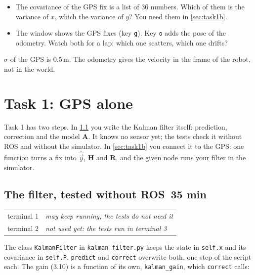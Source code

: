 \documentclass[11pt,a4paper,parskip=half]{scrartcl}
\makeatletter
\newcommand{\thema}[1]{\texttt{#1}}
\newcommand{\datei}[1]{\texttt{#1}}
\newcommand{\minutes}[1]{\texorpdfstring{\hfill{\normalsize\mdseries\color{ohmgrey}\faClock[regular]~#1 min}}{}}
\newcommand{\mat}[1]{\mathbf{#1}}
\newcommand{\solution}[1]{\ifdefined\withsolution\InputIfFileExists{solutions/#1}{}{}\fi}
\newcommand{\runningtext}[2]{\begin{tcolorbox}[base, colback=black!3, borderline west={2.5pt}{0pt}{ohmgrey},
        title={\faTerminal~Running}, coltitle=ohmgrey, colbacktitle=black!3, fonttitle=\small\bfseries,
        toptitle=2pt, bottomtitle=0pt, fontupper=\small]
  \begin{tabularx}{\linewidth}{@{}>{\color{ohmgrey}}l >{\raggedright\arraybackslash}X@{}}
    terminal 1 & #1 \\
    terminal 2 & #2
  \end{tabularx}
\end{tcolorbox}}
\newcommand{\notyet}[1]{\textcolor{ohmgrey}{\emph{#1}}}
\makeatother
\begin{document}
\begin{itemize}
  \item The covariance of the GPS fix is a list of 36 numbers. Which of them is the variance of \(x\), which
        the variance of \(y\)? You need them in \cref{sec:task1b}.
  \item The window shows the GPS fixes (key \thema{g}). Key \thema{o} adds the pose of the odometry. Watch
        both for a lap: which one scatters, which one drifts?
\end{itemize}

\begin{checkpoint}
\(\sigma\) of the GPS is 0.5\,m. The odometry gives the velocity in the frame of the robot, not in the world.
\end{checkpoint}
\solution{task0}

\newpage
\section{Task 1: GPS alone}
\label{sec:task1}
Task 1 has two steps. In \cref{sec:task1a} you write the Kalman filter itself: prediction, correction and the
model \(\mat A\). It knows no sensor yet; the tests check it without ROS and without the simulator. In
\cref{sec:task1b} you connect it to the GPS: one function turns a fix into \(\hat{\vec y}\), \(\mat H\) and
\(\mat R\), and the given node runs your filter in the simulator.

\subsection{The filter, tested without ROS\minutes{35}}
\label{sec:task1a}
\runningtext{\notyet{may keep running; the tests do not need it}}{\notyet{not used yet: the tests run in terminal 3}}

The class \thema{KalmanFilter} in \datei{kalman\_filter.py} keeps the state in \thema{self.x} and its covariance
in \thema{self.P}. \thema{predict} and \thema{correct} overwrite both, one step of the script each. The gain
(3.10) is a function of its own, \thema{kalman\_gain}, which \thema{correct} calls:
\end{document}
